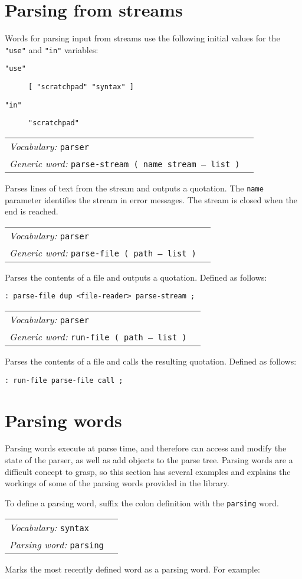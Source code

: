 \documentclass{book}
\newcommand{\vocabulary}[1]{\emph{Vocabulary:} \texttt{#1}&\\}
\newcommand{\parsingword}[2]{\index{\texttt{#1}}\emph{Parsing word:} \texttt{#2}&\\}
\newcommand{\genericword}[2]{\index{\texttt{#1}}\emph{Generic word:} \texttt{#2}&\\}
\newcommand{\wordtable}[1]{


\begin{tabularx}{12cm}{lX}
\hline
#1
\hline
\end{tabularx}

}
\begin{document}
\section{Parsing from streams}

Words for parsing input from streams use the following initial values for the \texttt{"use"} and \texttt{"in"} variables:

\begin{description}
\item[\texttt{"use"}] \texttt{[ "scratchpad" "syntax" ]}
\item[\texttt{"in"}] \texttt{"scratchpad"}
\end{description}

\wordtable{
\vocabulary{parser}
\genericword{parse-stream}{parse-stream~( name stream -- list )}
}
Parses lines of text from the stream and outputs a quotation. The \texttt{name} parameter identifies the stream in error messages. The stream is closed when the end is reached.

\wordtable{
\vocabulary{parser}
\genericword{parse-file}{parse-file~( path -- list )}
}
Parses the contents of a file and outputs a quotation. Defined as follows:
\begin{verbatim}
: parse-file dup <file-reader> parse-stream ;
\end{verbatim}
\wordtable{
\vocabulary{parser}
\genericword{run-file}{run-file~( path -- list )}
}
Parses the contents of a file and calls the resulting quotation. Defined as follows:
\begin{verbatim}
: run-file parse-file call ;
\end{verbatim}

\section{Parsing words}\label{parsing-words}

\parsingwordglos
Parsing words execute at parse time, and therefore can access and modify the state of the parser, as well as add objects to the parse tree. Parsing words are a difficult concept to grasp, so this section has several examples and explains the workings of some of the parsing words provided in the library.

To define a parsing word, suffix the colon definition with the \texttt{parsing} word.

\wordtable{
\vocabulary{syntax}
\parsingword{parsing}{parsing}
}
Marks the most recently defined word as a parsing word. For example:
\end{document}
